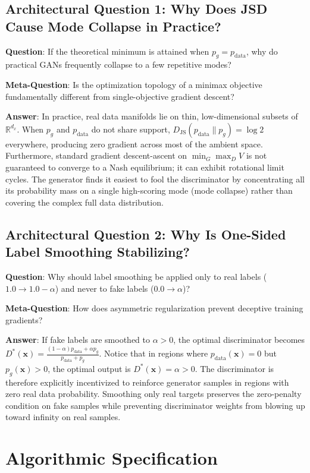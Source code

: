 \documentclass[11pt,a4paper]{article}
\theoremstyle{definition}
\begin{document}
\subsection{Architectural Question 1: Why Does JSD Cause Mode Collapse in Practice?}
\textbf{Question}: If the theoretical minimum is attained when $p_g = p_{\text{data}}$, why do practical GANs frequently collapse to a few repetitive modes?

\textbf{Meta-Question}: Is the optimization topology of a minimax objective fundamentally different from single-objective gradient descent?

\textbf{Answer}: In practice, real data manifolds lie on thin, low-dimensional subsets of $\mathbb{R}^{d_x}$. When $p_g$ and $p_{\text{data}}$ do not share support, $D_{\text{JS}}(p_{\text{data}} \parallel p_g) = \log 2$ everywhere, producing zero gradient across most of the ambient space. Furthermore, standard gradient descent-ascent on $\min_G \max_D V$ is not guaranteed to converge to a Nash equilibrium; it can exhibit rotational limit cycles. The generator finds it easiest to fool the discriminator by concentrating all its probability mass on a single high-scoring mode (mode collapse) rather than covering the complex full data distribution.

\subsection{Architectural Question 2: Why Is One-Sided Label Smoothing Stabilizing?}
\textbf{Question}: Why should label smoothing be applied only to real labels ($1.0 \to 1.0 - \alpha$) and never to fake labels ($0.0 \to \alpha$)?

\textbf{Meta-Question}: How does asymmetric regularization prevent deceptive training gradients?

\textbf{Answer}: If fake labels are smoothed to $\alpha > 0$, the optimal discriminator becomes $D^*(\mathbf{x}) = \frac{(1-\alpha)p_{\text{data}} + \alpha p_g}{p_{\text{data}} + p_g}$. Notice that in regions where $p_{\text{data}}(\mathbf{x}) = 0$ but $p_g(\mathbf{x}) > 0$, the optimal output is $D^*(\mathbf{x}) = \alpha > 0$. The discriminator is therefore explicitly incentivized to reinforce generator samples in regions with zero real data probability. Smoothing only real targets preserves the zero-penalty condition on fake samples while preventing discriminator weights from blowing up toward infinity on real samples.

\section{Algorithmic Specification}
\end{document}

